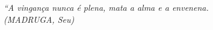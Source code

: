 \begin{epigrafe}
    \vspace*{\fill}
	\begin{flushright}
		\textit{``A vingança nunca é plena, mata a alma e a envenena.\\
		(MADRUGA, Seu)}
	\end{flushright}
\end{epigrafe}